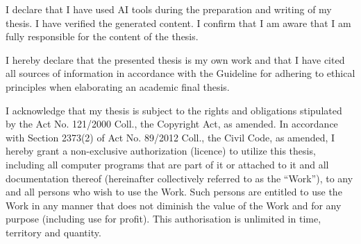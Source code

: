 \documentclass[english,bachelor,oneside]{ctufit-thesis}
\begin{document}
\begin{declarationpage}
    I declare that I have used AI tools during the preparation and writing of my thesis. 
    I have verified the generated content. 
    I confirm that I am aware that I am fully responsible for the content of the thesis.

	I hereby declare that the presented thesis is my own work and that I have cited all sources of information in accordance with the Guideline for adhering to ethical principles when elaborating an academic final thesis.
    
    I acknowledge that my thesis is subject to the rights and obligations stipulated by the Act No.
    121/2000 Coll., the Copyright Act, as amended. 
    In accordance with Section 2373(2) of Act No. 89/2012 Coll., the Civil Code, as amended, I hereby grant a non-exclusive authorization (licence) to utilize this thesis, including all computer programs that are part of it or attached to it and all documentation thereof (hereinafter collectively referred to as the ``Work''), to any and all persons who wish to use the Work. 
    Such persons are entitled to use the Work in any manner that does not diminish the value of the Work and for any purpose (including use for profit). 
    This authorisation is unlimited in time, territory and quantity.
\end{declarationpage}

\printtwopageabstract
\end{document}

